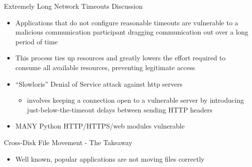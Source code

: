 \documentclass[pdf]{beamer}
\begin{document}
\begin{frame}{Extremely Long Network Timeouts Discussion}
  \begin{itemize}
  \item{Applications that do not configure reasonable timeouts are vulnerable
      to a malicious communication participant dragging communication out over a
      long period of time}
  \item{This process ties up resources and greatly lowers the effort required to
      consume all available resources, preventing legitimate access}
  \item{``Slowloris'' Denial of Service attack against http servers}
    \begin{itemize}
    \item{involves keeping a connection open to a vulnerable server by
        introducing just-below-the-timeout delays between sending HTTP headers}
        \end{itemize}
  \item{MANY Python HTTP/HTTPS/web modules vulnerable}
  \end{itemize}
\end{frame}


\begin{frame}{Cross-Disk File Movement - The Takeaway}
  \begin{itemize}
    \item{Well known, popular applications are not moving files correctly}
  \end{itemize}
\end{frame}
\end{document}
